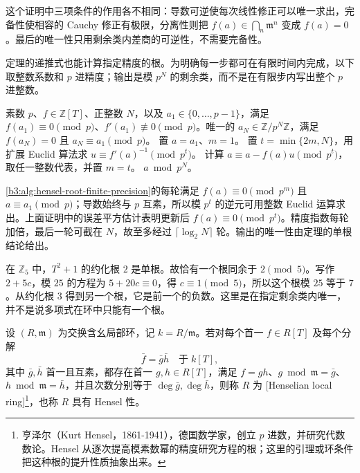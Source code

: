 这个证明中三项条件的作用各不相同：导数可逆使每次线性修正可以唯一求出，完备性使相容的 Cauchy 修正有极限，分离性则把 \(f(a)\in\bigcap_n\mathfrak m^n\) 变成 \(f(a)=0\)。最后的唯一性只用剩余类内差商的可逆性，不需要完备性。

\ProseParagraphBreak
定理的递推式也能计算指定精度的根。为明确每一步都可在有限时间内完成，以下取整数系数和 \(p\) 进精度；输出是模 \(p^N\) 的剩余类，而不是在有限步内写出整个 \(p\) 进整数。

\begin{algorithm}[htbp]
	\caption{Hensel 单根有限精度提升}
	\label{b3:alg:hensel-root-finite-precision}
	\begin{algorithmsteps}{素数 \(p\)、\(f\in\mathbb Z[T]\)、正整数 \(N\)，以及 \(a_1\in\{0,\ldots,p-1\}\)，满足 \(f(a_1)\equiv0\pmod p\)、\(f'(a_1)\not\equiv0\pmod p\)。}{唯一的 \(a_N\in\mathbb Z/p^N\mathbb Z\)，满足 \(f(a_N)=0\) 且 \(a_N\equiv a_1\pmod p\)。}
		\State 置 \(a=a_1\)、\(m=1\)。
			\State 置 \(t=\min\{2m,N\}\)，用扩展 Euclid 算法求 \(u\equiv f'(a)^{-1}\pmod{p^t}\)。
			\State 计算 \(a\equiv a-f(a)u\pmod{p^t}\)，取任一整数代表，并置 \(m=t\)。
		\EndWhile
		\State \Return \(a\bmod p^N\)。
	\end{algorithmsteps}
\end{algorithm}

\cref{b3:alg:hensel-root-finite-precision}的每轮满足 \(f(a)\equiv0\pmod{p^m}\) 且 \(a\equiv a_1\pmod p\)；导数始终与 \(p\) 互素，所以模 \(p^t\) 的逆元可用整数 Euclid 运算求出。上面证明中的误差平方估计表明更新后 \(f(a)\equiv0\pmod{p^t}\)。精度指数每轮加倍，最后一轮可截在 \(N\)，故至多经过 \(\lceil\log_2N\rceil\) 轮。输出的唯一性由定理的单根结论给出。

\begin{example}\label{b3:exm:hensel-root-five-adic}
	在 \(\mathbb Z_5\) 中，\(T^2+1\) 的约化根 \(2\) 是单根。故恰有一个根同余于 \(2\pmod5\)。写作 \(2+5c\)，模 \(25\) 的方程为 \(5+20c\equiv0\)，得 \(c\equiv1\pmod5\)，所以这个根模 \(25\) 等于 \(7\)。从约化根 \(3\) 得到另一个根，它是前一个的负数。这里是在指定剩余类内唯一，并不是说多项式在环中只能有一个根。
\end{example}

\begin{definition}\label{b3:def:henselian-local-ring}
	设 \((R,\mathfrak m)\) 为交换含幺局部环，记 \(k=R/\mathfrak m\)。若对每个首一 \(f\in R[T]\) 及每个分解
	\[
		\bar f=\bar g\bar h\quad\text{于}\;k[T],
	\]
	其中 \(\bar g,\bar h\) 首一且互素，都存在首一 \(g,h\in R[T]\)，满足 \(f=gh\)、\(g\bmod\mathfrak m=\bar g\)、\(h\bmod\mathfrak m=\bar h\)，并且次数分别等于 \(\deg\bar g,\deg\bar h\)，则称 \(R\) 为 [Henselian local ring]\footnote{亨泽尔（Kurt Hensel，1861-1941），德国数学家，创立 \(p\) 进数，并研究代数数论。Hensel 从逐次提高模素数幂的精度研究方程的根；这里的引理或环条件把这种根的提升性质抽象出来。}，也称 \(R\) 具有 Hensel 性。
\end{definition}

